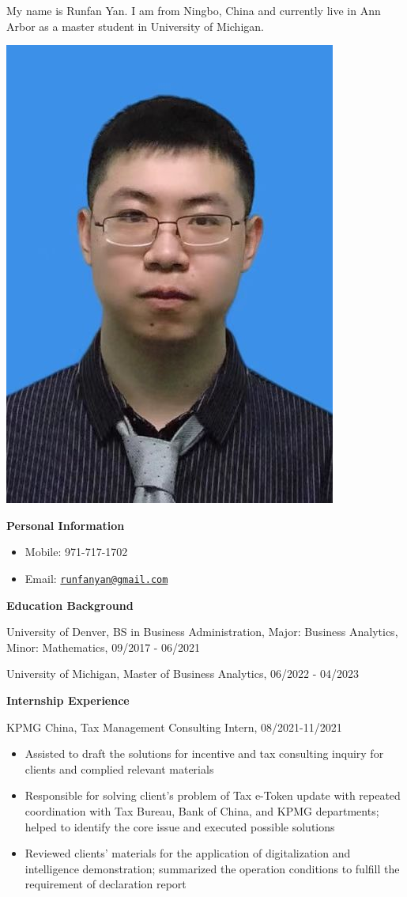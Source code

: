 \documentclass[
]{book}
\begin{document}
My name is Runfan Yan. I am from Ningbo, China and currently live in Ann Arbor as a master student in University of Michigan.

\includegraphics{Runfan_Photo.jpg}

\textbf{Personal Information}

\begin{itemize}
\item
  Mobile: 971-717-1702
\item
  Email: \href{mailto:runfanyan@gmail.com}{\nolinkurl{runfanyan@gmail.com}}
\end{itemize}

\textbf{Education Background}

University of Denver, BS in Business Administration, Major: Business Analytics, Minor: Mathematics, 09/2017 - 06/2021

University of Michigan, Master of Business Analytics, 06/2022 - 04/2023

\textbf{Internship Experience}

KPMG China, Tax Management Consulting Intern, 08/2021-11/2021

\begin{itemize}
\item
  Assisted to draft the solutions for incentive and tax consulting inquiry for clients and complied relevant materials
\item
  Responsible for solving client's problem of Tax e-Token update with repeated coordination with Tax Bureau, Bank of China, and KPMG departments; helped to identify the core issue and executed possible solutions
\item
  Reviewed clients' materials for the application of digitalization and intelligence demonstration; summarized the operation conditions to fulfill the requirement of declaration report
\end{itemize}
\end{document}
